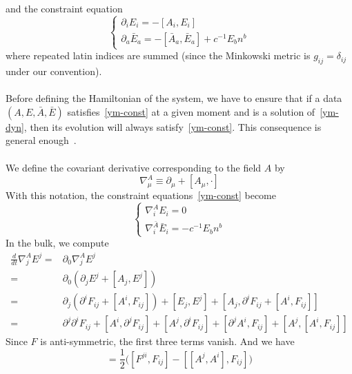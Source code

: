 and the constraint equation
\begin{equation}\label{ym-const}
\begin{cases}
\partial_i E_i  = - [A_i, E_i] \\
\partial_a \bar E_a = - [\bar A_a , \bar E_a]  + c^{-1} E_{b}n^b
\end{cases}
\end{equation}
where repeated latin indices are summed (since the Minkowski metric is $g_{ij} = \delta_{ij}$ under our convention). \\\\
Before defining the Hamiltonian of the system, we have to ensure that if a data $(A, E, \bar A, \bar E)$ satisfies~\cref{ym-const} at a given moment and is a solution of~\cref{ym-dyn}, then its evolution will always satisfy~\cref{ym-const}.
This consequence is general enough~\cite{Arnowitt1962}. \\\\
%
We define the covariant derivative corresponding to the field $A$ by 
\begin{equation*}
\nabla^A_\mu \equiv \partial_\mu + [A_\mu, \cdot]
\end{equation*}
With this notation, the constraint equations~\cref{ym-const} become
\begin{equation*}
\begin{cases}
\nabla^A_i E_i = 0 \\
%
\nabla^{\bar{A}}_i \bar E_i = - c^{-1} E_b n^b 
\end{cases}
\end{equation*}
In the bulk, we compute
\begin{equation*}
\begin{split}
\frac{d}{dt}\nabla^A_j E^j = & \partial_0 \nabla^A_j E^j  \\
= & \partial_0(\partial_j E^j + [A_j , E^j])  \\
= & \partial_j (\partial^i F_{ij} + [A^i, F_{ij}]) + [E_j, E^j] + [A_j, \partial^i F_{ij} + [A^i, F_{ij}]] \\
= & \partial^j\partial^i F_{ij}  + [A^i, \partial^j F_{ij}] + [A^j, \partial^i F_{ij}] + [\partial^j A^i, F_{ij}]+ [A^j, [A^i, F_{ij}]]
\end{split}
\end{equation*}
Since $F$ is anti-symmetric, the first three terms vanish. 
And we have 
\begin{equation}
[\partial^j A^i, F_{ij}] = \frac 1 2 \big( [F^{ji}, F_{ij}] - [[A^j, A^i], F_{ij}] \big)
\end{equation}
